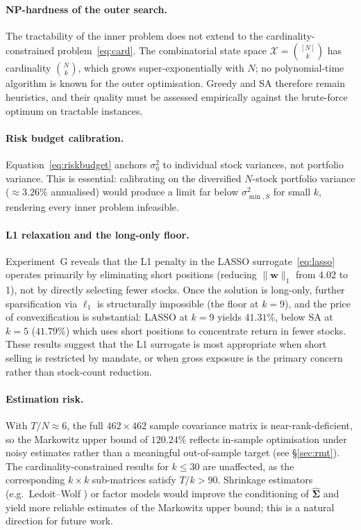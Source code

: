 \documentclass[11pt]{article}
\begin{document}
\paragraph{NP-hardness of the outer search.}
The tractability of the inner problem does not extend to the cardinality-constrained
problem~\eqref{eq:card}.  The combinatorial state space $\mathcal{X}=\binom{[N]}{k}$
has cardinality $\binom{N}{k}$, which grows super-exponentially with $N$; no
polynomial-time algorithm is known for the outer optimisation.  Greedy and SA
therefore remain heuristics, and their quality must be assessed empirically
against the brute-force optimum on tractable instances.

\paragraph{Risk budget calibration.}
Equation~\eqref{eq:riskbudget} anchors $\sigma_0^2$ to individual stock
variances, not portfolio variance.  This is essential: calibrating on the
diversified $N$-stock portfolio variance ($\approx 3.26\%$ annualised) would
produce a limit far below $\sigma^2_{\min,S}$ for small $k$, rendering every
inner problem infeasible.

\paragraph{L1 relaxation and the long-only floor.}
Experiment~G reveals that the L1 penalty in the LASSO surrogate~\eqref{eq:lasso}
operates primarily by eliminating short positions (reducing $\|\mathbf{w}\|_1$
from 4.02 to 1), not by directly selecting fewer stocks.  Once the solution is
long-only, further sparsification via $\ell_1$ is structurally impossible (the
floor at $k=9$), and the price of convexification is substantial: LASSO at $k=9$
yields $41.31\%$, below SA at $k=5$ ($41.79\%$) which uses short positions to
concentrate return in fewer stocks.  These results suggest that the L1 surrogate
is most appropriate when short selling is restricted by mandate, or when gross
exposure is the primary concern rather than stock-count reduction.

\paragraph{Estimation risk.}
With $T/N\approx 6$, the full $462\times 462$ sample covariance matrix
is near-rank-deficient, so the Markowitz upper bound of $120.24\%$ reflects
in-sample optimisation under noisy estimates rather than a meaningful out-of-sample
target (see \S\ref{sec:rmt}).  The cardinality-constrained results for $k\leq 30$
are unaffected, as the corresponding $k\times k$ sub-matrices satisfy $T/k>90$.
Shrinkage estimators (e.g.\ Ledoit--Wolf \cite{LedoitWolf2004}) or factor models
would improve the conditioning of $\hat{\boldsymbol{\Sigma}}$ and yield more
reliable estimates of the Markowitz upper bound; this is a natural direction for
future work.
\end{document}
